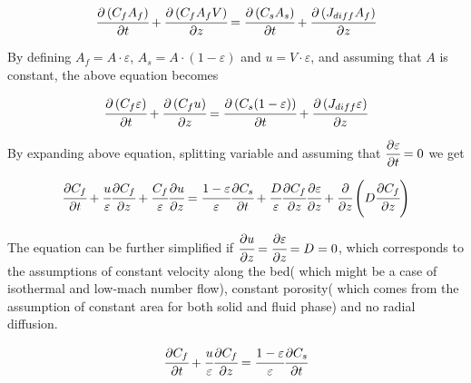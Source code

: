 \documentclass[../Article_Model_Parameters.tex]{subfiles}
\begin{document}
	{\footnotesize
		\begin{equation}
			\cfrac{\partial \left( C_f A_f \right)}{\partial t} + \cfrac{\partial \left( C_f A_f V \right)}{\partial z} = \cfrac{\partial \left( C_s A_s \right) }{\partial t} + \cfrac{\partial \left( J_{diff} A_f \right) }{\partial z}
		\end{equation}
	}

	By defining $A_f = A \cdot \varepsilon$, $A_s = A \cdot \left( 1-\varepsilon \right)$ and $u=V \cdot \varepsilon$, and assuming that $A$ is constant, the above equation becomes
	
	{\footnotesize
		\begin{equation}
			\cfrac{\partial \left( C_f \varepsilon \right)}{\partial t} + \cfrac{\partial \left( C_f u\right)}{\partial z} = \cfrac{\partial \left( C_s (1-\varepsilon) \right) }{\partial t} + \cfrac{\partial \left( J_{diff} \varepsilon \right) }{\partial z}
		\end{equation}
	}

	By expanding above equation, splitting variable and assuming that ${\footnotesize \cfrac{\partial \varepsilon}{\partial t}=0}$ we get
	
	{\footnotesize
		\begin{equation}
			\cfrac{\partial C_f}{\partial t} + \cfrac{u}{\varepsilon} \cfrac{\partial C_f}{\partial z} + \cfrac{C_f}{\varepsilon} \cfrac{\partial u}{\partial z} = \cfrac{1-\varepsilon}{\varepsilon} \cfrac{\partial C_s}{\partial t} + \cfrac{D}{\varepsilon} \cfrac{\partial C_f}{\partial z} \cfrac{\partial \varepsilon}{\partial z} + \cfrac{\partial}{\partial z} \left( D \cfrac{\partial C_f}{\partial z} \right)
		\end{equation}
	}
	
	The equation can be further simplified if $\cfrac{\partial u}{\partial z} = \cfrac{\partial \varepsilon}{\partial z} = D = 0$, which corresponds to the assumptions of constant velocity along the bed( which might be a case of isothermal and low-mach number flow), constant porosity( which comes from the assumption of constant area for both solid and fluid phase) and no radial diffusion.
	
	{\footnotesize
		\begin{equation}
			\cfrac{\partial C_f}{\partial t} + \cfrac{u}{\varepsilon} \cfrac{\partial C_f}{\partial z}  = \cfrac{1-\varepsilon}{\varepsilon} \cfrac{\partial C_s}{\partial t} 
			\label{EQ: Simplified_Species_Conservation}
		\end{equation}
	}
\end{document}
